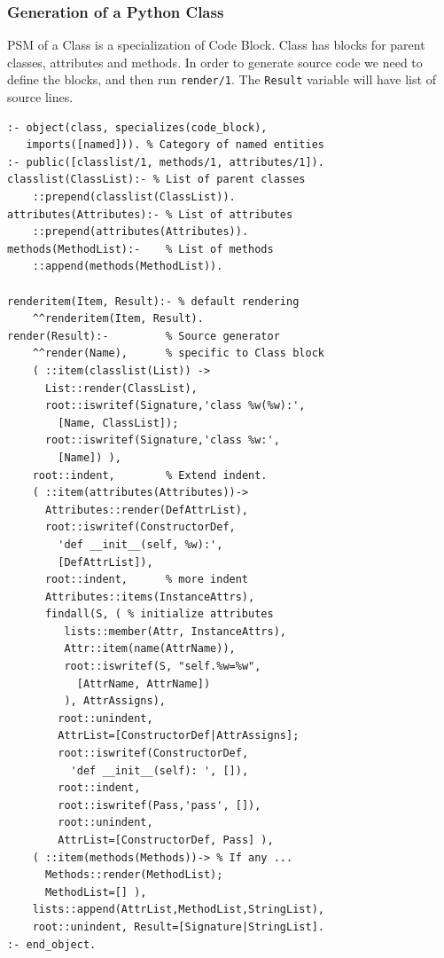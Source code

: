 \documentclass[10pt]{beamer}
\begin{document}
\begin{frame}[fragile]
  \frametitle{Generation of a Python Class}
  PSM of a Class is a specialization of Code Block. Class has blocks for parent classes, attributes and methods. In order to generate source code we need to define the blocks, and then run \verb|render/1|. The \verb|Result| variable will have list of source lines.
\begin{multicols}{2}
\begin{verbatim}
:- object(class, specializes(code_block),
   imports([named])). % Category of named entities
:- public([classlist/1, methods/1, attributes/1]).
classlist(ClassList):- % List of parent classes
    ::prepend(classlist(ClassList)).
attributes(Attributes):- % List of attributes
    ::prepend(attributes(Attributes)).
methods(MethodList):-    % List of methods
    ::append(methods(MethodList)).

renderitem(Item, Result):- % default rendering
    ^^renderitem(Item, Result).
render(Result):-         % Source generator
    ^^render(Name),      % specific to Class block
    ( ::item(classlist(List)) ->
      List::render(ClassList),
      root::iswritef(Signature,'class %w(%w):',
        [Name, ClassList]);
      root::iswritef(Signature,'class %w:',
        [Name]) ),
    root::indent,        % Extend indent.
    ( ::item(attributes(Attributes))->
      Attributes::render(DefAttrList),
      root::iswritef(ConstructorDef,
        'def __init__(self, %w):',
        [DefAttrList]),
      root::indent,      % more indent
      Attributes::items(InstanceAttrs),
      findall(S, ( % initialize attributes
         lists::member(Attr, InstanceAttrs),
         Attr::item(name(AttrName)),
         root::iswritef(S, "self.%w=%w",
           [AttrName, AttrName])
         ), AttrAssigns),
        root::unindent,
        AttrList=[ConstructorDef|AttrAssigns];
        root::iswritef(ConstructorDef,
          'def __init__(self): ', []),
        root::indent,
        root::iswritef(Pass,'pass', []),
        root::unindent,
        AttrList=[ConstructorDef, Pass] ),
    ( ::item(methods(Methods))-> % If any ...
      Methods::render(MethodList);
      MethodList=[] ),
    lists::append(AttrList,MethodList,StringList),
    root::unindent, Result=[Signature|StringList].
:- end_object.
\end{verbatim}
\end{multicols}
\end{frame}
\end{document}
